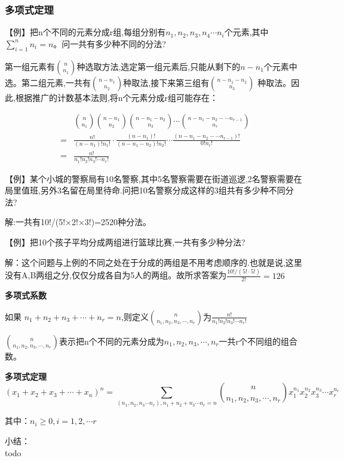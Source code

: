 \subsubsection{多项式定理}

【例】把n个不同的元素分成r组,每组分别有$n_{1},n_{2},n_{3},n_{4}\cdots n_{i}$个元素,其中$\sum_{i=1}^{n} n_i = n$。问一共有多少种不同的分法?

第一组元素有$\displaystyle { n\choose n_{1} }$种选取方法,选定第一组元素后,只能从剩下的$n-n_{1}$个元素中选。第二组元素,一共有$\displaystyle { n-n_{1} \choose n_{2} }$种取法,接下来第三组有$\displaystyle { n-n_{1}-n_{2} \choose n_{3} }$ 种取法。因此,根据推广的计数基本法则,将n个元素分成r组可能存在：

\begin{align*}  
	&{ n\choose n_{1} }{ n-n_{1} \choose n_{2} }{ n-n_{1}-n_{2} \choose n_{3} }\cdots{ n-n_{1}-n_{2} - \cdots n_{r-1} \choose n_{r} } \\  
	=& \frac{n!}{(n-n_{1})!n_{1}!} \cdot   \frac{(n-n_{1})!}{(n-n_{1}-n_{2})!n_{2}!} \cdots  \frac{(n-n_{1}-n_{2}-\cdots n_{r-1})!}{0! n_{r}!} \\  
	=& \frac{n!}{n_{1}!n_{2}!n_{3}!\cdots n_{r} !}  
\end{align*} 

【例】某个小城的警察局有10名警察,其中5名警察需要在街道巡逻,2名警察需要在局里值班,另外3名留在局里待命.问把10名警察分成这样的3组共有多少种不同分法?

解:一共有10!/(5!×2!×3!)=2520种分法。

【例】把10个孩子平均分成两组进行篮球比赛,一共有多少种分法?

解：这个问题与上例的不同之处在于分成的两组是不用考虑顺序的.也就是说,这里没有A,B两组之分,仅仅分成各自为5人的两组。故所求答案为$\displaystyle \frac{10!/(5! \cdot 5!)}{2!} =126  $



\begin{tcolorbox}[title = {多项式定理}]{\indent}

\textbf{多项式系数}

如果 $ n_{1}+n_{2}+n_{3}+\cdots+n_{r} = n$,则定义$\displaystyle {n \choose n_{1},n_{2},n_{3},\cdots,n_{r}}$为$\displaystyle \frac{n!}{n_{1}!n_{2}!n_{3}!\cdots n_{r} !} $

$\displaystyle {n \choose n_{1},n_{2},n_{3},\cdots,n_{r}}$表示把n个不同的元素分成为$n_{1},n_{2},n_{3},\cdots,n_{r}$一共r个不同组的组合数。

\tcblower

\textbf{多项式定理}
$$
(x_{1}+x_{2}+x_{3}+\cdots+x_{n})^{n}= 
\sum_{(n_{1},n_{2},n_{3}\cdots n_{r}),n_{1}+n_{2}+n_{3}\cdots n_{r} = n}
{n \choose n_{1},n_{2},n_{3},\cdots,n_{r}}
x_{1}^{n_{1}} x_{2}^{n_{2}} x_{3}^{n_{3}}\cdots x_{r}^{n_{r}}
$$

其中：$ n_{i} \geqslant 0, i=1,2,\cdots r$

\end{tcolorbox}	

小结：\\todo 





